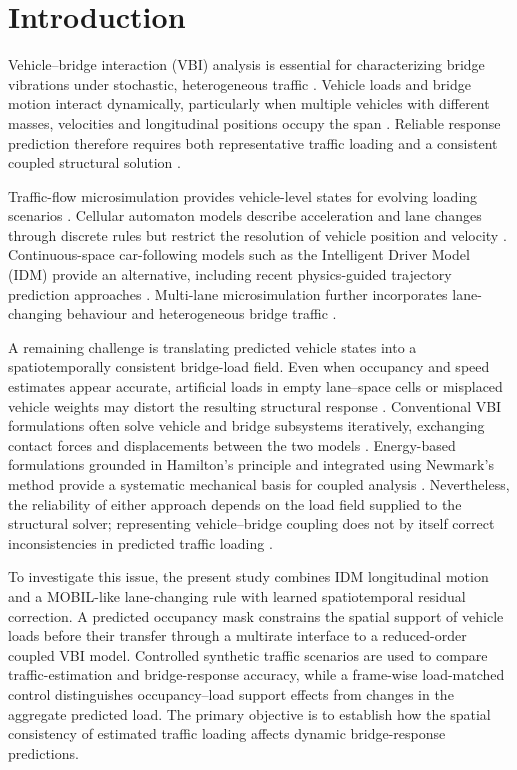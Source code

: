 \documentclass[journal]{IEEEtran}
\begin{document}
\vspace{-3pt}
\section{Introduction}

Vehicle--bridge interaction (VBI) analysis is essential for characterizing bridge vibrations under stochastic, heterogeneous traffic \cite{han2024,yin2025,huang2026,mei2025}. Vehicle loads and bridge motion interact dynamically, particularly when multiple vehicles with different masses, velocities and longitudinal positions occupy the span \cite{aloisio2023,lifeng2023,kreslin2024,shi2024,yau2024,yin2023,wei2025}. Reliable response prediction therefore requires both representative traffic loading and a consistent coupled structural solution \cite{cantero2024,dong2023}.

Traffic-flow microsimulation provides vehicle-level states for evolving loading scenarios \cite{huang2026,wang2024}. Cellular automaton models describe acceleration and lane changes through discrete rules but restrict the resolution of vehicle position and velocity \cite{rickert1996,ruan2017}. Continuous-space car-following models such as the Intelligent Driver Model (IDM) provide an alternative, including recent physics-guided trajectory prediction approaches \cite{treiber2000,geng2023,liu2023}. Multi-lane microsimulation further incorporates lane-changing behaviour and heterogeneous bridge traffic \cite{caprani2016,obrien2015,xiong2020}.

A remaining challenge is translating predicted vehicle states into a spatiotemporally consistent bridge-load field. Even when occupancy and speed estimates appear accurate, artificial loads in empty lane--space cells or misplaced vehicle weights may distort the resulting structural response \cite{wangxu2019}. Conventional VBI formulations often solve vehicle and bridge subsystems iteratively, exchanging contact forces and displacements between the two models \cite{yangfonder1996,green1994,pan2002}. Energy-based formulations grounded in Hamilton's principle and integrated using Newmark's method provide a systematic mechanical basis for coupled analysis \cite{mo2024,newmark1959}. Nevertheless, the reliability of either approach depends on the load field supplied to the structural solver; representing vehicle--bridge coupling does not by itself correct inconsistencies in predicted traffic loading \cite{yang2005,cantero2010}.

To investigate this issue, the present study combines IDM longitudinal motion and a MOBIL-like lane-changing rule with learned spatiotemporal residual correction. A predicted occupancy mask constrains the spatial support of vehicle loads before their transfer through a multirate interface to a reduced-order coupled VBI model. Controlled synthetic traffic scenarios are used to compare traffic-estimation and bridge-response accuracy, while a frame-wise load-matched control distinguishes occupancy--load support effects from changes in the aggregate predicted load. The primary objective is to establish how the spatial consistency of estimated traffic loading affects dynamic bridge-response predictions.
\end{document}
